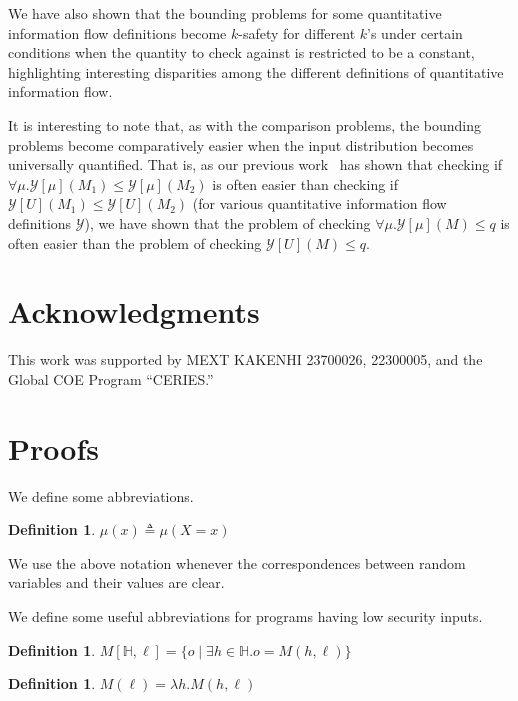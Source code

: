 \documentclass{llncs}
\newtheorem{definition}[theorem]{Definition}
\newcommand{\aset}[1]{\{{#1}\}}
\begin{document}
We have also shown that the bounding problems for some quantitative
information flow definitions become $k$-safety for different $k$'s
under certain conditions when the quantity to check against is
restricted to be a constant, highlighting interesting disparities
among the different definitions of quantitative information flow.

It is interesting to note that, as with the comparison problems, the
bounding problems become comparatively easier when the input
distribution becomes universally quantified.  That is, as our previous
work~\cite{DBLP:conf/csfw/yasuoka2010} has shown that checking if
$\forall \mu.\mathcal{Y}[\mu](M_1) \leq \mathcal{Y}[\mu](M_2)$ is
often easier than checking if $\mathcal{Y}[U](M_1) \leq
\mathcal{Y}[U](M_2)$ (for various quantitative information flow
definitions $\mathcal{Y}$), we have shown that the problem of checking
$\forall \mu.\mathcal{Y}[\mu](M) \leq q$ is often easier than the
problem of checking $\mathcal{Y}[U](M) \leq q$.

\section*{Acknowledgments}
  This work was supported by MEXT KAKENHI 23700026, 22300005, and the
  Global COE Program ``CERIES.''




\appendix
\section{Proofs}
\label{appendix}

We define some abbreviations.
\begin{definition}
\label{def:distabrv}
  $\mu(x)\triangleq \mu(X=x)$
\end{definition}
We use the above notation whenever the correspondences between random variables
and their values are clear.

We define some useful abbreviations for programs having low security inputs.

\begin{definition}
  $M[\mathbb{H},\ell]=\aset{o\mid \exists h\in\mathbb{H}.
    o=M(h,\ell)}$
\end{definition}

\begin{definition}
$M(\ell)=\lambda h. M(h,\ell)$
\end{definition}
\end{document}
